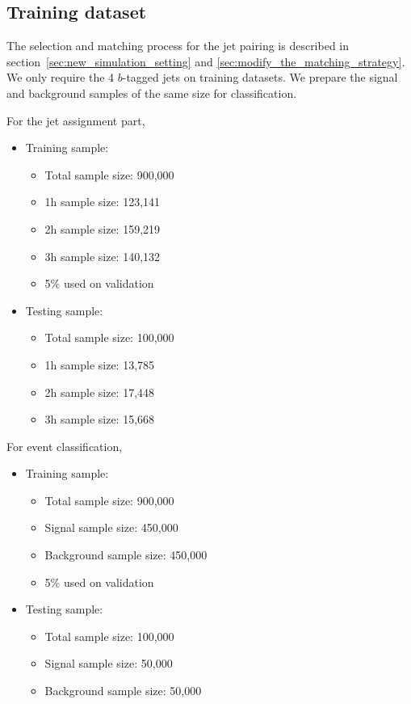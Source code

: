 \documentclass[12pt]{article}
\begin{document}
	\subsection{Training dataset}%
	\label{sub:training_dataset_spanet_classifier}
    The selection and matching process for the jet pairing is described in section~\ref{sec:new_simulation_setting} and \ref{sec:modify_the_matching_strategy}. We only require the 4 $b$-tagged jets on training datasets. We prepare the signal and background samples of the same size for classification.

		For the jet assignment part,
		\begin{itemize}
			\item Training sample:
			\begin{itemize}
                \item Total sample size: 900,000
                \item 1h sample size: 123,141
                \item 2h sample size: 159,219
                \item 3h sample size: 140,132
				\item 5\% used on validation
			\end{itemize}
			\item Testing sample:
			\begin{itemize}
                \item Total sample size: 100,000
                \item 1h sample size: 13,785
                \item 2h sample size: 17,448
                \item 3h sample size: 15,668
			\end{itemize}
		\end{itemize}

		For event classification,
		\begin{itemize}
			\item Training sample:
			\begin{itemize}
				\item Total sample size: 900,000
				\item Signal sample size: 450,000
				\item Background sample size: 450,000
				\item 5\% used on validation
			\end{itemize}
			\item Testing sample:
			\begin{itemize}
				\item Total sample size: 100,000
				\item Signal sample size: 50,000
				\item Background sample size: 50,000
			\end{itemize}
		\end{itemize}
\end{document}
